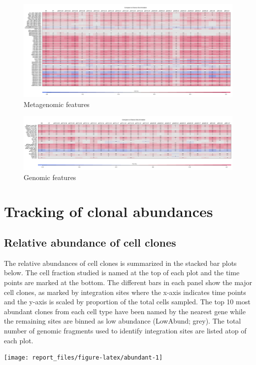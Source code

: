 \documentclass[]{article}
\begin{document}
\begin{figure}[H]

{\centering \includegraphics[width=1\linewidth]{epiGenHeatMap_ddd/main} 

}

\caption{Metagenomic features}\label{fig:unnamed-chunk-3}
\end{figure}

\begin{figure}[H]

{\centering \includegraphics[width=1\linewidth]{genHeatMap_ddd/main} 

}

\caption{Genomic features}\label{fig:unnamed-chunk-4}
\end{figure}
\newpage

\hypertarget{tracking-of-clonal-abundances}{%
\section{Tracking of clonal
abundances}\label{tracking-of-clonal-abundances}}

\hypertarget{relative-abundance-of-cell-clones}{%
\subsection{Relative abundance of cell
clones}\label{relative-abundance-of-cell-clones}}

The relative abundances of cell clones is summarized in the stacked bar
plots below. The cell fraction studied is named at the top of each plot
and the time points are marked at the bottom. The different bars in each
panel show the major cell clones, as marked by integration sites where
the x-axis indicates time points and the y-axis is scaled by proportion
of the total cells sampled. The top 10 most abundant clones from each
cell type have been named by the nearest gene while the remaining sites
are binned as low abundance (LowAbund; grey). The total number of
genomic fragments used to identify integration sites are listed atop of
each plot.

\begin{center}\texttt{[image: report\_files/figure-latex/abundant-1]} \end{center}

\newpage




\newpage
\singlespacing 

\end{document}
